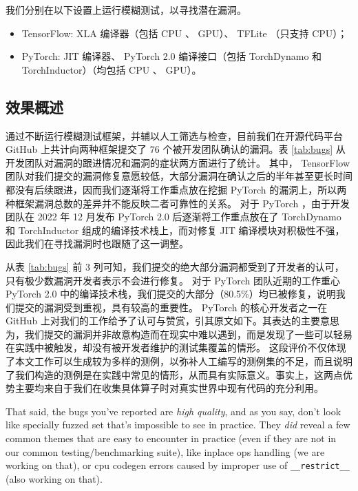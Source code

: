 我们分别在以下设置上运行模糊测试，以寻找潜在漏洞。

\begin{itemize}
    \item TensorFlow: XLA 编译器（包括 CPU 、 GPU）、 TFLite （只支持 CPU）；
    \item PyTorch: JIT 编译器、 PyTorch 2.0 编译接口（包括 TorchDynamo 和 TorchInductor）（均包括 CPU 、 GPU）。
\end{itemize}

\subsection{效果概述}

通过不断运行模糊测试框架，并辅以人工筛选与检查，目前我们在开源代码平台 GitHub 上共计向两种框架提交了 76 个被开发团队确认的漏洞。表 \ref{tab:bugs} 从开发团队对漏洞的跟进情况和漏洞的症状两方面进行了统计。
其中， TensorFlow 团队对我们提交的漏洞修复意愿较低，大部分漏洞在确认之后的半年甚至更长时间都没有后续跟进，因而我们逐渐将工作重点放在挖掘 PyTorch 的漏洞上，所以两种框架漏洞总数的差异并不能反映二者可靠性的关系。
对于 PyTorch ，由于开发团队在 2022 年 12 月发布 PyTorch 2.0 后逐渐将工作重点放在了 TorchDynamo 和 TorchInductor 组成的编译技术栈上，而对修复 JIT 编译模块对积极性不强，因此我们在寻找漏洞时也跟随了这一调整。

从表 \ref{tab:bugs} 前 3 列可知，我们提交的绝大部分漏洞都受到了开发者的认可，只有极少数漏洞开发者表示不会进行修复。
对于 PyTorch 团队近期的工作重心 PyTorch 2.0 中的编译技术栈，我们提交的大部分（80.5\%）均已被修复，说明我们提交的漏洞受到重视，具有较高的重要性。
PyTorch 的核心开发者之一在 GitHub 上对我们的工作给予了认可与赞赏，引其原文\cite{ngimel_comments}如下。其表达的主要意思为，我们提交的漏洞并非故意构造而在现实中难以遇到，而是发现了一些可以轻易在实践中被触发，却没有被开发者维护的测试集覆盖的情形。
这段评价不仅体现了本文工作可以生成较为多样的测例，以弥补人工编写的测例集的不足，而且说明了我们构造的测例是在实践中常见的情形，从而具有实际意义。事实上，这两点优势主要均来自于我们在收集具体算子时对真实世界中现有代码的充分利用。

\begin{shadequote}
\small
That said, the bugs you've reported are \textit{high quality}, and as you say, don't look like specially fuzzed set that's impossible to see in practice. They \textit{did} reveal a few common themes that are easy to encounter in practice (even if they are not in our common testing/benchmarking suite), like inplace ops handling (we are working on that), or cpu codegen errors caused by improper use of \texttt{\_\_restrict\_\_} (also working on that).
\end{shadequote}

